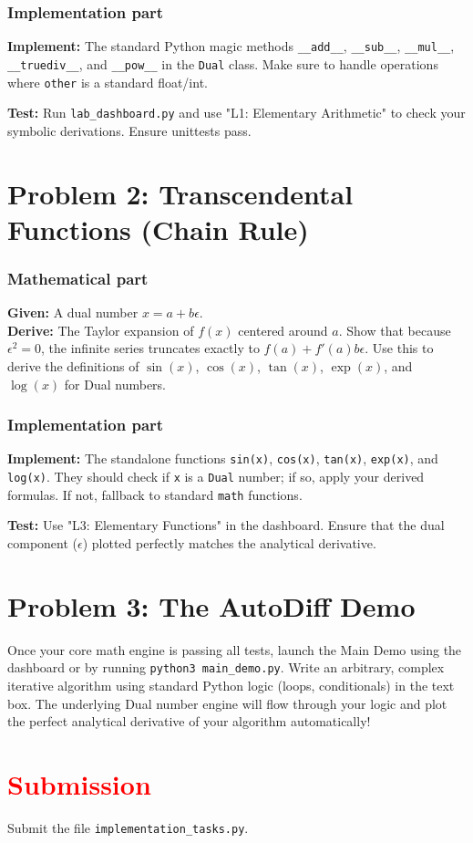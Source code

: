 \documentclass[11pt]{article}
\begin{document}
\subsubsection*{Implementation part}
\textbf{Implement:} The standard Python magic methods \lstinline|__add__|, \lstinline|__sub__|, \lstinline|__mul__|, \lstinline|__truediv__|, and \lstinline|__pow__| in the \lstinline|Dual| class. Make sure to handle operations where \lstinline|other| is a standard float/int.

\textbf{Test:} Run \lstinline|lab_dashboard.py| and use "L1: Elementary Arithmetic" to check your symbolic derivations. Ensure unittests pass.

\section*{Problem 2: Transcendental Functions (Chain Rule)}

\subsubsection*{Mathematical part}
\textbf{Given:} A dual number $x = a + b\epsilon$. \\
\textbf{Derive:} The Taylor expansion of $f(x)$ centered around $a$. Show that because $\epsilon^2 = 0$, the infinite series truncates exactly to $f(a) + f'(a)b\epsilon$. Use this to derive the definitions of $\sin(x)$, $\cos(x)$, $\tan(x)$, $\exp(x)$, and $\log(x)$ for Dual numbers.

\subsubsection*{Implementation part}
\textbf{Implement:} The standalone functions \lstinline|sin(x)|, \lstinline|cos(x)|, \lstinline|tan(x)|, \lstinline|exp(x)|, and \lstinline|log(x)|. They should check if \lstinline|x| is a \lstinline|Dual| number; if so, apply your derived formulas. If not, fallback to standard \lstinline|math| functions.

\textbf{Test:} Use "L3: Elementary Functions" in the dashboard. Ensure that the dual component ($\epsilon$) plotted perfectly matches the analytical derivative.

\section*{Problem 3: The AutoDiff Demo}
Once your core math engine is passing all tests, launch the Main Demo using the dashboard or by running \lstinline|python3 main_demo.py|. Write an arbitrary, complex iterative algorithm using standard Python logic (loops, conditionals) in the text box. The underlying Dual number engine will flow through your logic and plot the perfect analytical derivative of your algorithm automatically!

\section*{\textcolor{red}{Submission}}
Submit the file \texttt{implementation\_tasks.py}.
\end{document}

